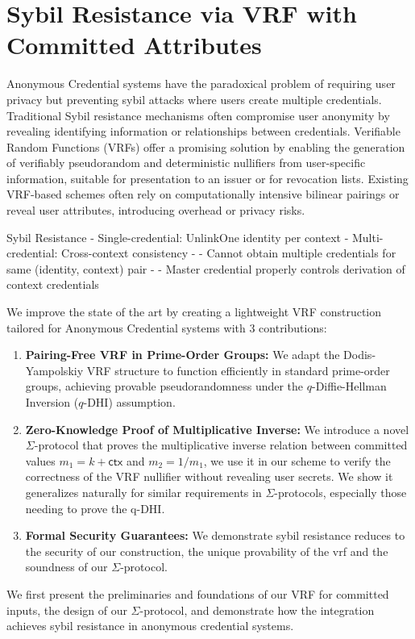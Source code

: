 \newpage
\section{Sybil Resistance via VRF with Committed Attributes}
Anonymous Credential systems have the paradoxical problem of requiring user privacy but preventing sybil attacks where users create multiple credentials. Traditional Sybil resistance mechanisms often compromise user anonymity by revealing identifying information or relationships between credentials. Verifiable Random Functions (VRFs) offer a promising solution by enabling the generation of verifiably pseudorandom and deterministic nullifiers from user-specific information, suitable for presentation to an issuer or for revocation lists. Existing VRF-based schemes often rely on computationally intensive bilinear pairings or reveal user attributes, introducing overhead or privacy risks.


Sybil Resistance
- Single-credential: UnlinkOne identity per context
- Multi-credential: Cross-context consistency
- - Cannot obtain multiple credentials for same (identity, context) pair
- - Master credential properly controls derivation of context credentials


\noindent We improve the state of the art by creating a lightweight VRF construction tailored for Anonymous Credential systems with 3 contributions:
\begin{enumerate}
        \item \textbf{Pairing-Free VRF in Prime-Order Groups:} We adapt the Dodis-Yampolskiy VRF structure to function efficiently in standard prime-order groups, achieving provable pseudorandomness under the $q$-Diffie-Hellman Inversion ($q$-DHI) assumption.

        \item \textbf{Zero-Knowledge Proof of Multiplicative Inverse:} We introduce a novel $\Sigma$-protocol that proves the multiplicative inverse relation between committed values $m_1 = k + \textsf{ctx}$ and $m_2 = 1/m_1$, we use it in our scheme to verify the correctness of the VRF nullifier without revealing user secrets. We show it generalizes naturally for similar requirements in $\Sigma$-protocols, especially those needing to prove the q-DHI.

         \item \textbf{Formal Security Guarantees:} We demonstrate sybil resistance reduces to the security of our construction, the unique provability of the vrf and the soundness of our $\Sigma$-protocol.
\end{enumerate}
We first present the preliminaries and foundations of our VRF for committed inputs, the design of our $\Sigma$-protocol, and demonstrate how the integration achieves sybil resistance in anonymous credential systems.

